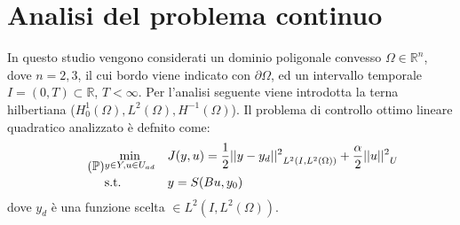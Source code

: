 \section{Analisi del problema continuo}
\label{chap:Continuos}

In questo studio vengono considerati un dominio poligonale convesso $\Omega \in \mathbb{R}^n$, dove $n=2,3$, il cui bordo viene indicato con $\partial\Omega$, ed un intervallo temporale $I = (0,T) \subset \mathbb{R}$, $T < \infty$. 
Per l'analisi seguente viene introdotta la terna hilbertiana (${H^{1}_{0}(\Omega)},{L^{2}(\Omega)},{H^{-1}(\Omega)}$).
Il problema di controllo ottimo lineare quadratico analizzato è defnito come:
{\renewcommand\arraystretch{2}
\begin{equation}
\tag{$\mathbb{P}$}
\begin{aligned}
& \underset{y \in Y, u \in U_{ad}}{\text{min}}
& & J(y,u) = \frac{1}{2}{||y-y_d||^{2}}_{L^2(I,{L^{2}(\Omega)})} + \frac{\alpha}{2}{||u||^{2}}_U \\
& \text{s.t.} & & y = S(Bu,y_0) \\
\label{eq:200}
\end{aligned}
\end{equation}
} %
dove $y_d$ è una funzione scelta $\in L^2(I,{L^{2}(\Omega)})$.

